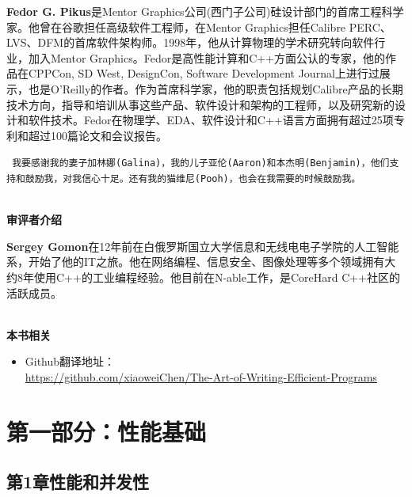 \documentclass[11pt,a4paper,UTF8]{book}
\begin{document}
\textbf{Fedor G. Pikus}是Mentor Graphics公司(西门子公司)硅设计部门的首席工程科学家。他曾在谷歌担任高级软件工程师，在Mentor Graphics担任Calibre PERC、LVS、DFM的首席软件架构师。1998年，他从计算物理的学术研究转向软件行业，加入Mentor Graphics。Fedor是高性能计算和C++方面公认的专家，他的作品在CPPCon, SD West, DesignCon, Software Development Journal上进行过展示，也是O'Reilly的作者。作为首席科学家，他的职责包括规划Calibre产品的长期技术方向，指导和培训从事这些产品、软件设计和架构的工程师，以及研究新的设计和软件技术。Fedor在物理学、EDA、软件设计和C++语言方面拥有超过25项专利和超过100篇论文和会议报告。
\begin{center}
\tt
我要感谢我的妻子加林娜(Galina)，我的儿子亚伦(Aaron)和本杰明(Benjamin)，他们支持和鼓励我，对我信心十足。还有我的猫维尼(Pooh)，也会在我需要的时候鼓励我。
\end{center}

\thispagestyle{empty}
\hspace*{\fill} \\ %
\noindent\textbf{审评者介绍}

\textbf{Sergey Gomon}在12年前在白俄罗斯国立大学信息和无线电电子学院的人工智能系，开始了他的IT之旅。他在网络编程、信息安全、图像处理等多个领域拥有大约8年使用C++的工业编程经验。他目前在N-able工作，是CoreHard C++社区的活跃成员。


\hspace*{\fill} \\ %
\noindent\textbf{本书相关}
\begin{itemize}
\item Github翻译地址：\\\url{https://github.com/xiaoweiChen/The-Art-of-Writing-Efficient-Programs}
\end{itemize}
\newpage

\pagestyle{empty}


\tableofcontents
\newpage


\color{white}
\section*{第一部分：性能基础}
\pagecolor{mygray}
\textbf{}
\newpage
\color{black}
\pagecolor{white}

\subsection*{ 第1章\hspace{0.5cm}性能和并发性}

\end{document}
